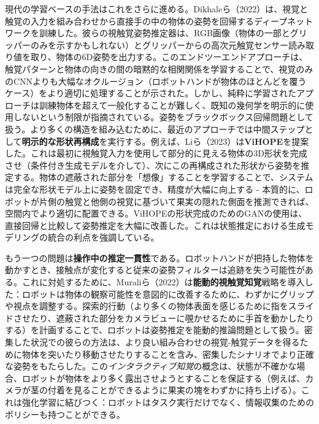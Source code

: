 \documentclass[a4paper,fleqn,10pt,twocolumn]{template_v1.0}
\begin{document}
現代の学習ベースの手法はこれをさらに進める。Dikhaleら（2022）は、視覚と触覚の入力を組み合わせから直接手の中の物体の姿勢を回帰するディープネットワークを訓練した\cite{Dikhale2022}。彼らの視触覚姿勢推定器は、RGB画像（物体の一部とグリッパーのみを示すかもしれない）とグリッパーからの高次元触覚センサー読み取り値を取り、物体の6D姿勢を出力する。このエンドツーエンドアプローチは、触覚パターンと物体の向きの間の暗黙的な相関関係を学習することで、視覚のみのCNNよりも大幅なオクルージョン（ロボットハンドが物体のほとんどを覆うケース）をより適切に処理することが示された\cite{Villalonga2021}。しかし、純粋に学習されたアプローチは訓練物体を超えて一般化することが難しく、既知の幾何学を明示的に使用しないという制限が指摘されている。姿勢をブラックボックス回帰問題として扱う\cite{Villalonga2021}。より多くの構造を組み込むために、最近のアプローチでは中間ステップとして\textbf{明示的な形状再構成}を実行する。例えば、Liら（2023）は\textbf{ViHOPE}を提案した。これは最初に視触覚入力を使用して部分的に見える物体の3D形状を完成させ（条件付き生成モデルを介して）、次にこの再構成された形状から姿勢を推定する\cite{Li2023}\cite{Li2023a}。物体の遮蔽された部分を「想像」することを学習することで、システムは完全な形状モデル上に姿勢を固定でき、精度が大幅に向上する - 本質的に、ロボットが片側の触覚と他側の視覚に基づいて果実の隠れた側面を推測できれば、空間内でより適切に配置できる。ViHOPEの形状完成のためのGANの使用は、直接回帰と比較して姿勢推定を大幅に改善した\cite{Li2023}\cite{Li2023a}。これは状態推定における生成モデリングの統合の利点を強調している。

もう一つの問題は\textbf{操作中の推定一貫性}である。ロボットハンドが把持した物体を動かすとき、接触点が変化すると従来の姿勢フィルターは追跡を失う可能性がある。これに対処するために、Muraliら（2022）は\textbf{能動的視触覚知覚}戦略を導入した：ロボットは物体の観察可能性を意図的に改善するために、わずかにグリップや視点を調整する\cite{Murali2022}。探索的行動（より多くの物体表面を感じるために指をスライドさせたり、遮蔽された部分をカメラビューに覗かせるために手首を動かしたりする）を計画することで、ロボットは姿勢推定を能動的推論問題として扱う。密集した状況での彼らの方法は、より良い組み合わせの視覚-触覚データを得るために物体を突いたり移動させたりすることを含み、密集したシナリオでより正確な姿勢をもたらした\cite{Murali2022}。この\textit{インタラクティブ知覚}の概念は、状態が不確かな場合、ロボットが物体をより多く露出させようとすることを保証する（例えば、カメラが茎の付着を見ることができるように果実の塊をわずかに持ち上げる）。これは強化学習に結びつく：ロボットはタスク実行だけでなく、情報収集のためのポリシーも持つことができる。
\end{document}
